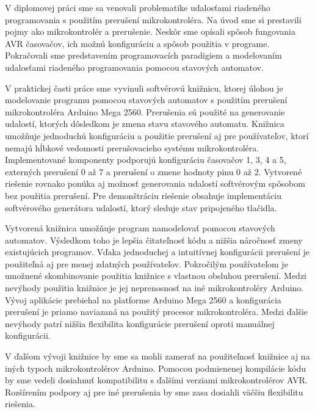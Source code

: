 
V diplomovej práci sme sa venovali problematike udalosťami riadeného programovania s použitím prerušení mikrokontroléra. Na úvod sme si prestavili pojmy ako mikrokontrolér
a prerušenie. Neskôr sme opísali spôsob fungovania AVR časovačov, ich možnú konfiguráciu a spôsob použitia v programe. Pokračovali sme predstavením programovacích paradigiem a modelovaním
udalosťami riadeného programovania pomocou stavových automatov. \par
V praktickej časti práce sme vyvinuli softvérovú knižnicu, ktorej úlohou je modelovanie programu pomocou stavových automatov s použitím prerušení mikrokontroléra Arduino
Mega 2560. Prerušenia sú použité na generovanie udalostí, ktorých dôsledkom je zmena stavu stavového automatu. Knižnica umožňuje jednoduchú konfiguráciu a použitie
prerušení aj pre používateľov, ktorí nemajú hĺbkové vedomosti prerušovacieho systému mikrokontroléra. Implementované komponenty podporujú konfiguráciu
časovačov 1, 3, 4 a 5, externých prerušení 0 až 7 a prerušení o zmene hodnoty pinu 0 až 2. Vytvorené riešenie rovnako ponúka aj možnosť generovania
udalostí softvérovým spôsobom bez použitia prerušení. Pre demonštráciu riešenie obsahuje implementáciu softvérového generátora udalostí, ktorý sleduje stav pripojeného
tlačidla.
\par
Vytvorená knižnica umožňuje program namodelovať pomocou stavových automatov. Výsledkom toho je lepšia čitateľnosť kódu a nižšia náročnosť zmeny existujúcich programov.
Vďaka jednoduchej a intuitívnej konfigurácii prerušení je použiteľná aj pre menej zdatných používateľov. Pokročilým používateľom je umožnené skombinovanie použitia
knižnice s vlastnou obsluhou prerušení. Medzi nevýhody použitia knižnice je jej neprenosnosť na iné mikrokontroléry Arduino. Vývoj aplikácie prebiehal na platforme
Arduino Mega 2560 a konfigurácia prerušení je priamo naviazaná na použitý procesor mikrokontroléra. Medzi ďalšie nevýhody patrí nižšia flexibilita konfigurácie
prerušení oproti manuálnej konfigurácii. \par
V ďalšom vývoji knižnice by sme sa mohli zamerať na použiteľnosť knižnice aj na iných typoch mikrokontrolérov Arduino. Pomocou podmienenej kompilácie kódu
by sme vedeli dosiahnuť kompatibilitu s ďalšími verziami mikrokontrolérov AVR. Rozšírením podpory aj pre iné prerušenia by sme zasa dosiahli väčšiu flexibilitu
riešenia.